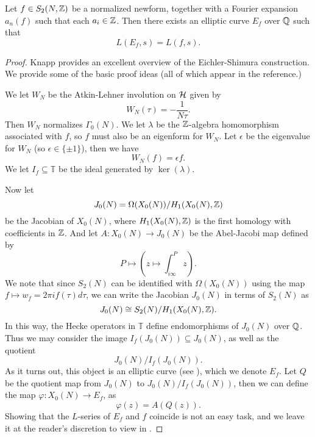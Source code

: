 \begin{thm} Let $f \in S_2(N,\mathbb{Z})$ be a normalized newform, together with a Fourier expansion $a_n(f)$ such that each $a_i \in \mathbb{Z}$. Then there exists an elliptic curve $E_f$ over $\mathbb{Q}$ such that
$$L(E_f,s) = L(f,s).$$
\end{thm}
\begin{proof}
Knapp \cite[Chapter XI]{Knapp} provides an excellent overview of the Eichler-Shimura construction. We provide some of the basic proof ideas (all of which appear in the reference.)

 We let $W_N$ be the Atkin-Lehner involution on $\mathcal{H}$ given by
$$W_N(\tau) = -\frac{1}{N\tau}.$$
Then  $W_N$ normalizes $\Gamma_0(N)$. We let $\lambda$ be the $\mathbb{Z}$-algebra homomorphism associated with $f$, so $f$ must also be an eigenform for $W_N$. Let $\epsilon$ be the eigenvalue for $W_N$ (so $\epsilon \in \{\pm 1\}$), then we have
$$W_N(f) = \epsilon f.$$
We let $I_f \subseteq \mathbb{T}$ be the ideal generated by $\ker(\lambda)$.

Now let
$$J_0(N) = \Omega(X_0(N)) / H_1(X_0(N),\mathbb{Z})$$ 
be the Jacobian of $X_0(N)$, where $H_1(X_0(N),\mathbb{Z})$ is the first homology with coefficients in $\mathbb{Z}$. And let  $A:X_0(N) \to J_0(N)$ be the Abel-Jacobi map defined by 
$$P \mapsto \left(z \mapsto \int_{i\infty}^P z\right).$$
We note that since $S_2(N)$ can be identified with $\Omega(X_0(N))$ using the map $f \mapsto w_f = 2 \pi i f(\tau) d\tau$, we can write the Jacobian $J_0(N)$ in terms of $S_2(N)$ as
$$J_0(N) \cong S_2(N)/H_1(X_0(N),\mathbb{Z}).$$
In this way, the Hecke operators in $\mathbb{T}$ define endomorphisms of $J_0(N)$ over $\mathbb{Q}$. Thus we may consider the image $I_f(J_0(N)) \subseteq J_0(N)$, as well as the quotient
$$J_0(N)/I_f(J_0(N)).$$
As it turns out, this object is an elliptic curve (see \cite[Chapter XI, Sections 10 and 11]{Knapp}), which we denote $E_f$. Let $Q$ be the quotient map from $J_0(N)$ to $J_0(N)/I_f(J_0(N))$, then we can define the map $\varphi:X_0(N) \to E_f$, as
$$\varphi(z) = A(Q(z)).$$
Showing that the $L$-series of $E_f$ and $f$ coincide is not an easy task, and we leave it at the reader's discretion to view in \cite{Shimura}.
\end{proof}

